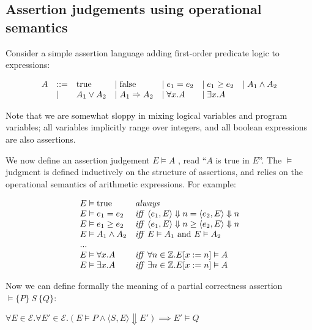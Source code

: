 \documentclass[11pt]{article}
\begin{document}
\subsection{Assertion judgements using operational semantics}

Consider a simple assertion language adding first-order predicate logic to
\WhileLang expressions:

\[
\begin{array}{lllllll}
A & ::= & \mbox{true} & \mathrel{\mid} \mbox{false} & \mathrel{\mid} e_1 = e_2 & \mathrel{\mid} e_1 \ge e_2 & \mathrel{\mid} A_1 \wedge A_2 \\
  & \mathrel{\mid} & A_1 \vee A_2 & \mathrel{\mid} A_1 \Rightarrow A_2 & \mathrel{\mid} \forall x . A & \mathrel{\mid} \exists x . A
\end{array}
\]

Note that we are somewhat sloppy in mixing logical variables and program
variables; all \WhileLang variables implicitly range over integers, and all \WhileLang
boolean expressions are also assertions.

We now define an assertion judgement $E \vDash A$ , read ``$A$ is true in $E$''.
The $\vDash$ judgment is defined inductively on the structure of assertions, and
relies on the operational semantics of \WhileLang arithmetic expressions.  For
example:

\[
\begin{array}{ll}
E \vDash \mbox{true} & \mbox{\emph{always}} \\
E \vDash e_1 = e_2 & \mbox{\emph{iff}}~\langle e_1, E \rangle \Downarrow n = \langle e_2, E \rangle \Downarrow n \\
E \vDash e_1 \ge e_2 & \mbox{\emph{iff}}~ \langle e_1, E \rangle \Downarrow n \ge \langle e_2, E \rangle \Downarrow n \\
E \vDash A_1 \wedge A_2 & \mbox{\emph{iff}}~ E \vDash A_1 \text{~and~} E \vDash A_2 \\
... \\
E \vDash \forall x. A & \mbox{\emph{iff}}~ \forall n \in \mathbb{Z}  . E [x := n ] \vDash A \\
E \vDash \exists x. A &  \mbox{\emph{iff}}~ \exists n \in \mathbb{Z} . E[x:=n] \vDash A \\
\end{array}
\]



Now we can define formally the meaning of a partial correctness assertion
$\vDash \{ P \} ~ S ~ \{ Q \}$:

\begin{center}
$\forall E \in \mathcal{E} . \forall E' \in \mathcal{E} . ( E \vDash P \wedge
\langle S, E \rangle \Downarrow E' ) \implies E' \vDash Q$
\end{center}
\end{document}
